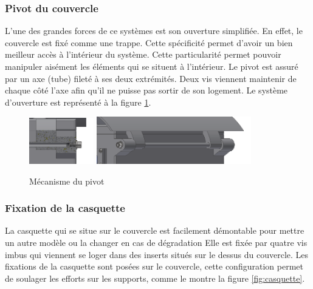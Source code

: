 \subsubsection{Pivot du couvercle}

L’une des grandes forces de ce systèmes est son ouverture simplifiée. En effet, le couvercle est fixé 
comme une trappe. Cette spécificité permet d’avoir un bien meilleur accès à l’intérieur du système. 
Cette particularité permet pouvoir manipuler aisément les éléments qui se situent à l’intérieur. Le 
pivot est assuré par un axe (tube) fileté à ses deux extrémités. Deux vis viennent maintenir de chaque 
côté l’axe afin qu’il ne puisse pas sortir de son logement. Le système d'ouverture est représenté à la 
figure \ref{fig:pivot}.

\begin{figure}[H]
    \centering
    \includegraphics[width=0.25\textwidth]{Images/photos_PGA/pivotcoupe.PNG}
    \includegraphics[width=0.6\textwidth]{Images/photos_PGA/pivotnormal.PNG}
    \caption{Mécanisme du pivot}
    \label{fig:pivot}
\end{figure}

\subsubsection{Fixation de la casquette}

La casquette qui se situe sur le couvercle est facilement démontable pour mettre un autre modèle ou 
la changer en cas de dégradation Elle est fixée par quatre vis imbus qui viennent se loger dans des inserts 
situés sur le dessus du couvercle. Les fixations de la casquette sont posées sur le couvercle, cette 
configuration permet de soulager les efforts sur les supports, comme le montre la figure \ref{fig:casquette}.

